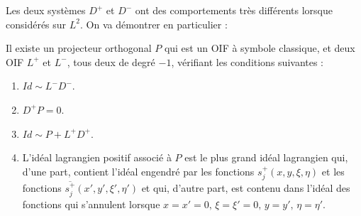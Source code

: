 Les deux systèmes $D^+$ et $D^-$ ont des comportements très différents lorsque considérés sur $L^2$. On va démontrer en particulier :

\begin{prop}
Il existe un projecteur orthogonal $P$ qui est un OIF à symbole classique, et deux OIF $L^+$ et $L^-$, tous deux de degré $-1$, vérifiant les conditions suivantes :

\begin{enumerate}
  \item $Id \sim L^-D^-$.
  \item $D^+P =0$.
  \item $Id \sim P + L^+D^+$.
  \item L'idéal lagrangien positif associé à $P$ est le plus grand idéal lagrangien qui, d'une part, contient l'idéal engendré par les fonctions $s_j^+(x,y,\xi,\eta)$ et les fonctions $\overline{s_j^+}(x',y',\xi',\eta')$ et qui, d'autre part, est contenu dans l'idéal des fonctions qui s'annulent lorsque $x=x'=0, \, \xi=\xi'=0,\, y=y',\, \eta=\eta'$.
\end{enumerate}
\end{prop}
